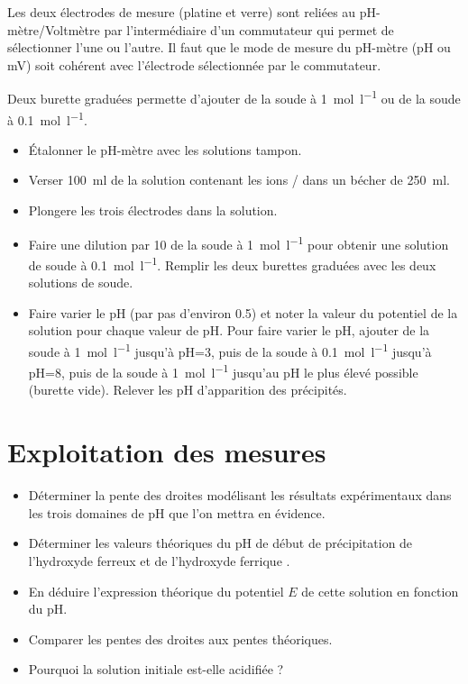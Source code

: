 \documentclass{tp}
\begin{document}
Les deux électrodes de mesure (platine et verre) sont reliées au pH-mètre/Voltmètre par l'intermédiaire d'un commutateur qui permet de sélectionner l'une ou l'autre. Il faut que le mode de mesure du pH-mètre (pH ou mV) soit cohérent avec l'électrode sélectionnée par le commutateur.

Deux burette graduées permette d'ajouter de la soude à \SI{1}{\mol\per\litre} ou de la soude à \SI{0.1}{\mol\per\litre}.

\begin{itemize}
  \item Étalonner le pH-mètre avec les solutions tampon.
  \item Verser \SI{100}{\milli\litre} de la solution contenant les ions / dans un bécher de \SI{250}{\milli\litre}.

  \item Plongere les trois électrodes dans la solution.

  \item Faire une dilution par 10 de la soude à \SI{1}{\mol\per\litre} pour obtenir une solution de soude à \SI{0.1}{\mol\per\litre}. Remplir les deux burettes graduées avec les deux solutions de soude.

  \item Faire varier le pH (par pas d'environ \num{0.5}) et noter la valeur du potentiel de la solution pour chaque valeur de pH. Pour faire varier le pH, ajouter de la soude à \SI{1}{\mol\per\litre} jusqu'à pH=3, puis de la soude à \SI{0.1}{\mol\per\litre} jusqu'à pH=8, puis de la soude à \SI{1}{\mol\per\litre} jusqu'au pH le plus élevé possible (burette vide). Relever les pH d'apparition des précipités. 
\end{itemize}

\section{Exploitation des mesures}%
\label{sec:exploitation_des_mesures}

\begin{itemize}
  \item Déterminer la pente des droites modélisant les résultats expérimentaux dans les trois domaines de pH que l'on mettra en évidence.

  \item Déterminer les valeurs théoriques du pH de début de précipitation de l'hydroxyde ferreux  et de l'hydroxyde ferrique .

  \item En déduire l'expression théorique du potentiel $E$ de cette solution en fonction du pH. 

  \item Comparer les pentes des droites aux pentes théoriques.

  \item Pourquoi la solution initiale est-elle acidifiée ?
\end{itemize}
\end{document}
